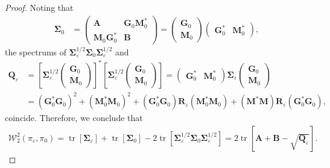 \documentclass[noinfoline]{imsart}\setcounter{tocdepth}{2}
\newcommand{\m}[1]{\mathbf{#1}}
\renewcommand{\c}[1]{\mathcal{#1}}
\DeclareMathOperator{\tr}{tr}
\theoremstyle{plain}
\begin{document}
\begin{proof}
Noting that
\begin{align*}
    \m{\Sigma}_{0} &= \left(
    \begin{array}{c|c}
    \m{A} & \m{G}_{0} \m{M}_{0}^{*} \\
    \hline
    \m{M}_{0} \m{G}_{0}^{*} & \m{B}
    \end{array}
    \right) = \left(
    \begin{array}{c}
    \m{G}_{0} \\
    \hline
    \m{M}_{0}
    \end{array}
    \right) \left(
    \begin{array}{c|c}
    \m{G}_{0}^{*} & \m{M}_{0}^{*}
    \end{array}
    \right),
\end{align*}
the spectrums of $\m{\Sigma}_{\varepsilon}^{1/2} \m{\Sigma}_{0} \m{\Sigma}_{\varepsilon}^{1/2}$ and
\begin{align*}
    \m{Q}_{\varepsilon} &= \left[\m{\Sigma}_{\varepsilon}^{1/2} \left(
    \begin{array}{c}
    \m{G}_{0} \\
    \hline
    \m{M}_{0}
    \end{array}
    \right) \right]^{*} \left[\m{\Sigma}_{\varepsilon}^{1/2} \left(
    \begin{array}{c}
    \m{G}_{0} \\
    \hline
    \m{M}_{0}
    \end{array}
    \right) \right] = \left(
    \begin{array}{c|c}
    \m{G}_{0}^{*} & \m{M}_{0}^{*}
    \end{array}
    \right) \m{\Sigma}_{\varepsilon} \left(
    \begin{array}{c}
    \m{G}_{0} \\
    \hline
    \m{M}_{0}
    \end{array}
    \right) \\
    &= (\m{G}_{0}^{*} \m{G}_{0})^{2} + (\m{M}_{0}^{*} \m{M}_{0})^{2} + (\m{G}_{0}^{*} \m{G}_{0}) \m{R}_{\varepsilon} (\m{M}_{0}^{*} \m{M}_{0}) + (\m{M}^{*} \m{M}) \m{R}_{\varepsilon} (\m{G}_{0}^{*} \m{G}_{0}),
\end{align*}
coincide. Therefore, we conclude that
\begin{align*}
    \c{W}_{2}^{2}(\pi_{\varepsilon}, \pi_{0}) = \tr[\m{\Sigma}_{\varepsilon}] + \tr[\m{\Sigma}_{0}] - 2 \tr [\m{\Sigma}_{\varepsilon}^{1/2} \m{\Sigma}_{0} \m{\Sigma}_{\varepsilon}^{1/2}] = 2 \tr [\m{A} + \m{B}- \sqrt{\m{Q}_{\varepsilon}}].
\end{align*}
\end{proof}
\end{document}
